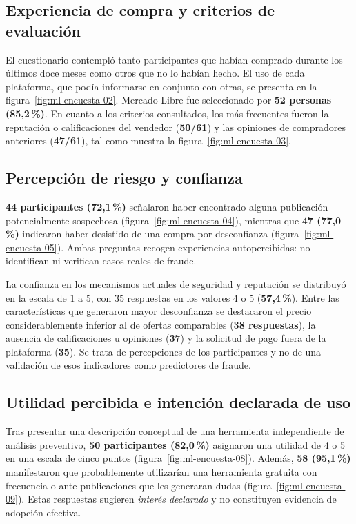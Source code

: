 \subsection{Experiencia de compra y criterios de evaluación}

El cuestionario contempló tanto participantes que habían comprado durante los últimos doce meses como otros que no lo habían hecho. El uso de cada plataforma, que podía informarse en conjunto con otras, se presenta en la figura~\ref{fig:ml-encuesta-02}. Mercado Libre fue seleccionado por \textbf{52 personas (85,2\,\%)}. En cuanto a los criterios consultados, los más frecuentes fueron la reputación o calificaciones del vendedor (\textbf{50/61}) y las opiniones de compradores anteriores (\textbf{47/61}), tal como muestra la figura~\ref{fig:ml-encuesta-03}.

\subsection{Percepción de riesgo y confianza}

\textbf{44 participantes (72,1\,\%)} señalaron haber encontrado alguna publicación potencialmente sospechosa (figura~\ref{fig:ml-encuesta-04}), mientras que \textbf{47 (77,0\,\%)} indicaron haber desistido de una compra por desconfianza (figura~\ref{fig:ml-encuesta-05}). Ambas preguntas recogen experiencias autopercibidas: no identifican ni verifican casos reales de fraude.

La confianza en los mecanismos actuales de seguridad y reputación se distribuyó en la escala de 1 a 5, con 35 respuestas en los valores 4 o 5 (\textbf{57,4\,\%}). Entre las características que generaron mayor desconfianza se destacaron el precio considerablemente inferior al de ofertas comparables (\textbf{38 respuestas}), la ausencia de calificaciones u opiniones (\textbf{37}) y la solicitud de pago fuera de la plataforma (\textbf{35}). Se trata de percepciones de los participantes y no de una validación de esos indicadores como predictores de fraude.

\subsection{Utilidad percibida e intención declarada de uso}

Tras presentar una descripción conceptual de una herramienta independiente de análisis preventivo, \textbf{50 participantes (82,0\,\%)} asignaron una utilidad de 4 o 5 en una escala de cinco puntos (figura~\ref{fig:ml-encuesta-08}). Además, \textbf{58 (95,1\,\%)} manifestaron que probablemente utilizarían una herramienta gratuita con frecuencia o ante publicaciones que les generaran dudas (figura~\ref{fig:ml-encuesta-09}). Estas respuestas sugieren \emph{interés declarado} y no constituyen evidencia de adopción efectiva.

